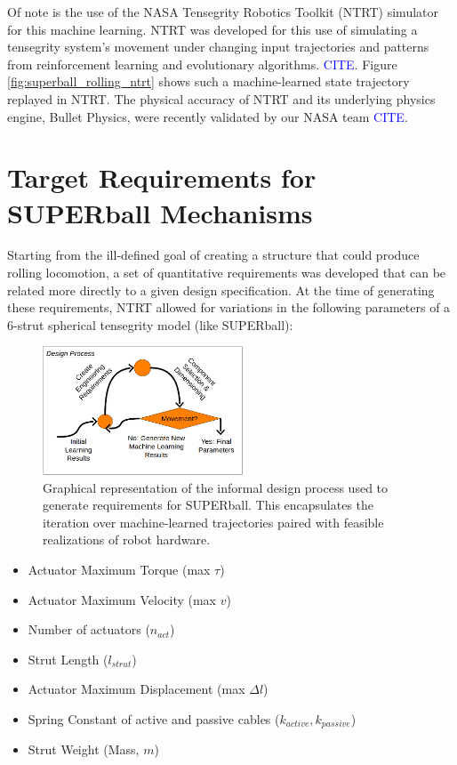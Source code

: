\documentclass[12pt]{report}
\begin{document}
Of note is the use of the NASA Tensegrity Robotics Toolkit (NTRT) simulator for this machine learning. 
NTRT was developed for this use of simulating a tensegrity system's movement under changing input trajectories and patterns from reinforcement learning and evolutionary algorithms. \textcolor{blue}{CITE}.
Figure \ref{fig:superball_rolling_ntrt} shows such a machine-learned state trajectory replayed in NTRT.
The physical accuracy of NTRT and its underlying physics engine, Bullet Physics, were recently validated by our NASA team \textcolor{blue}{CITE}.

\section{Target Requirements for SUPERball Mechanisms}

Starting from the ill-defined goal of creating a structure that could produce rolling locomotion, a set of quantitative requirements was developed that can be related more directly to a given design specification.
At the time of generating these requirements, NTRT allowed for variations in the following parameters of a 6-strut spherical tensegrity model (like SUPERball):

\begin{figure}
  \begin{center}
  \vspace{-0.5cm}
    \includegraphics[width=0.53\textwidth]{img/design_process.jpg}
    \caption{Graphical representation of the informal design process used to generate requirements for SUPERball. This encapsulates the iteration over machine-learned trajectories paired with feasible realizations of robot hardware.}
    \label{fig:design_process}
  \end{center}
  \vspace{-0.7cm}
\end{figure}

\begin{itemize}
  \setlength{\itemsep}{0cm}%
  \setlength{\parskip}{0cm}%
  \item Actuator Maximum Torque (max $\tau$)
  \item Actuator Maximum Velocity (max $v$)
  \item Number of actuators ($n_{act}$)
  \item Strut Length ($l_{strut}$)
  \item Actuator Maximum Displacement (max $\Delta l$)
  \item Spring Constant of active and passive cables ($k_{active}, k_{passive}$)
  \item Strut Weight (Mass, $m$)
\end{itemize}
\end{document}
